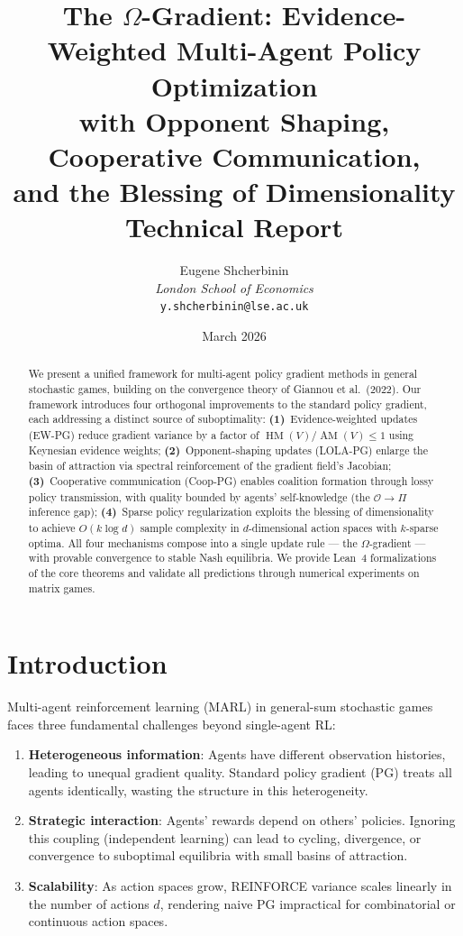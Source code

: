 \documentclass[11pt,a4paper]{article}
\title{
\textbf{The $\Omega$-Gradient: Evidence-Weighted Multi-Agent Policy Optimization\\
with Opponent Shaping, Cooperative Communication,\\
and the Blessing of Dimensionality}\\[10pt]
\large Technical Report
}
\author{
Eugene Shcherbinin\\
\textit{London School of Economics}\\
\texttt{y.shcherbinin@lse.ac.uk}
}
\date{March 2026}
\DeclareMathOperator{\AM}{AM}
\DeclareMathOperator{\HM}{HM}
\begin{document}
\maketitle

\begin{abstract}
We present a unified framework for multi-agent policy gradient methods
in general stochastic games, building on the convergence theory of
Giannou et al.\ (2022). Our framework introduces four orthogonal
improvements to the standard policy gradient, each addressing a
distinct source of suboptimality:
\textbf{(1)}~Evidence-weighted updates (EW-PG) reduce gradient variance
by a factor of $\HM(V)/\AM(V) \leq 1$ using Keynesian evidence weights;
\textbf{(2)}~Opponent-shaping updates (LOLA-PG) enlarge the basin of
attraction via spectral reinforcement of the gradient field's Jacobian;
\textbf{(3)}~Cooperative communication (Coop-PG) enables coalition
formation through lossy policy transmission, with quality bounded by
agents' self-knowledge (the $\mathcal{O} \to \Pi$ inference gap);
\textbf{(4)}~Sparse policy regularization exploits the blessing of
dimensionality to achieve $O(k \log d)$ sample complexity in
$d$-dimensional action spaces with $k$-sparse optima.
All four mechanisms compose into a single update rule --- the
$\Omega$-gradient --- with provable convergence to stable Nash equilibria.
We provide Lean~4 formalizations of the core theorems and validate
all predictions through numerical experiments on matrix games.
\end{abstract}

\tableofcontents
\newpage


\section{Introduction}

Multi-agent reinforcement learning (MARL) in general-sum stochastic games
faces three fundamental challenges beyond single-agent RL:
\begin{enumerate}
    \item \textbf{Heterogeneous information}: Agents have different
    observation histories, leading to unequal gradient quality.
    Standard policy gradient (PG) treats all agents identically,
    wasting the structure in this heterogeneity.

    \item \textbf{Strategic interaction}: Agents' rewards depend on
    others' policies. Ignoring this coupling (independent learning)
    can lead to cycling, divergence, or convergence to suboptimal
    equilibria with small basins of attraction.

    \item \textbf{Scalability}: As action spaces grow, REINFORCE
    variance scales linearly in the number of actions $d$, rendering
    naive PG impractical for combinatorial or continuous action spaces.
\end{enumerate}
\end{document}
